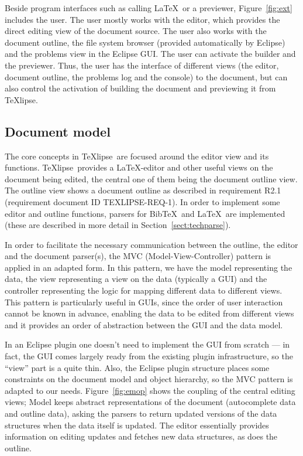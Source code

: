 \documentclass[a4paper,11pt,twoside]{article}
\newcommand{\texlipse}{\TeX lipse}
\begin{document}
Beside program interfaces such as calling \LaTeX\ or a previewer,
Figure~\ref{fig:ext} includes the user. The user mostly works with the
editor, which provides the direct editing view of the document
source. The user also works with the document outline, the file system
browser (provided automatically by Eclipse) and the problems view in
the Eclipse GUI. The user can activate the builder and the
previewer. Thus, the user has the interface of different views (the editor,
document outline, the problems log and the console) to the document, but can
also control the activation of building the document and previewing it from 
\texlipse.


\subsection{Document model}
\label{sect:archdm}

The core concepts in \texlipse\ are focused around the editor view and its 
functions. \texlipse\ provides a \LaTeX -editor and other useful views on the 
document being edited, the central one of them being the document outline view. 
The outline view shows a document outline as described in requirement R2.1 
(requirement document ID TEXLIPSE-REQ-1). In order to implement some editor and 
outline functions, parsers for Bib\TeX\ and \LaTeX\ are implemented (these are 
described in more detail in Section~\ref{sect:techparse}).

In order to facilitate the necessary communication between the outline, the 
editor and the document parser(s), the MVC (Model-View-Controller) pattern is 
applied in an adapted form. In this pattern, we have the model representing the 
data, the view representing a view on the data (typically a GUI) and the 
controller representing the logic for mapping different data to different 
views. This pattern is particularly useful in GUIs, since the order of user 
interaction cannot be known in advance, enabling the data to be edited from 
different views and it provides an order of abstraction between the GUI and the 
data model.

In an Eclipse plugin one doesn't need to implement the GUI from scratch --- in 
fact, the GUI comes largely ready from the existing plugin infrastructure, so 
the ``view'' part is a quite thin. Also, the Eclipse plugin structure places 
some constraints on the document model and object hierarchy, so the MVC pattern 
is adapted to our needs. Figure~\ref{fig:emop} shows the coupling of the 
central editing views; Model keeps abstract representations of the document 
(autocomplete data and outline data), asking the parsers to return updated 
versions of the data structures when the data itself is updated. The editor 
essentially provides information on editing updates and fetches new data
structures, as does the outline.
\end{document}
